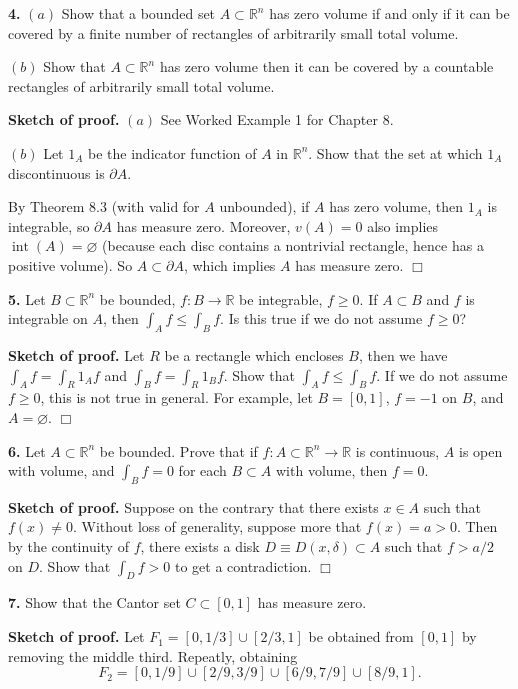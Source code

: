 \documentclass{article}
\begin{document}
    \textbf{4.} $(a)$ Show that a bounded set $A \subset \mathbb{R}^n$ has
zero volume if and only if it can be covered by a finite number of
rectangles of arbitrarily small total volume.

$(b)$ Show that $A\subset \mathbb{R}^n$ has zero volume then it can be
covered by a countable rectangles of arbitrarily small total volume.

    \textbf{Sketch of proof.} $(a)$ See Worked Example 1 for Chapter 8.

$(b)$ Let $1_A$ be the indicator function of $A$ in $\mathbb{R}^n$. Show
that the set at which $1_A$ discontinuous is $\partial A$.

By Theorem 8.3 (with valid for $A$ unbounded), if $A$ has zero volume,
then $1_A$ is integrable, so $\partial A$ has measure zero. Moreover,
$v(A) = 0$ also implies $\operatorname{int}(A) = \varnothing$ (because
each disc contains a nontrivial rectangle, hence has a positive volume).
So $A \subset \partial A$, which implies $A$ has measure zero. $\Box$

    \textbf{5.} Let $B\subset \mathbb{R}^n$ be bounded, $f:B\to \mathbb{R}$
be integrable, $f\ge 0$. If $A\subset B$ and $f$ is integrable on $A$,
then $\int_A f \le \int_B f$. Is this true if we do not assume
$f \ge 0$?

    \textbf{Sketch of proof.} Let $R$ be a rectangle which encloses $B$,
then we have $\int_A f = \int_R 1_A f$ and $\int_B f = \int_R 1_B f$.
Show that $\int_A f \le \int_B f$. If we do not assume $f \ge 0$, this
is not true in general. For example, let $B = [0,1]$, $f = -1$ on $B$,
and $A = \varnothing$. $\Box$

    \textbf{6.} Let $A\subset \mathbb{R}^n$ be bounded. Prove that if
$f :A\subset \mathbb{R}^n \to \mathbb{R}$ is continuous, $A$ is open
with volume, and $\int_B f = 0$ for each $B\subset A$ with volume, then
$f = 0$.

    \textbf{Sketch of proof.} Suppose on the contrary that there exists
$x \in A$ such that $f(x) \ne 0$. Without loss of generality, suppose
more that $f(x) = a > 0$. Then by the continuity of $f$, there exists a
disk $D\equiv D(x,\delta) \subset A$ such that $f > a/2$ on $D$. Show
that $\int_D f > 0$ to get a contradiction. $\Box$

    \textbf{7.} Show that the Cantor set $C \subset [0,1]$ has measure zero.

    \textbf{Sketch of proof.} Let $F_1 = [0,1/3] \cup [2/3,1]$ be obtained
from $[0,1]$ by removing the middle third. Repeatly, obtaining
\[F_2 = [0,1/9]\cup [2/9,3/9] \cup [6/9,7/9] \cup [8/9,1].\]
\end{document}
